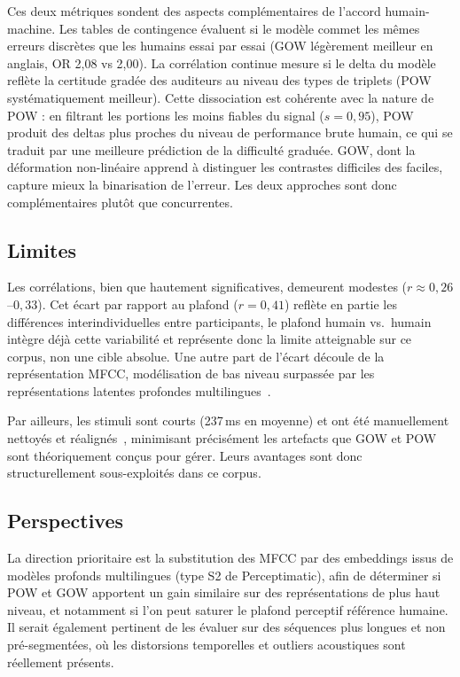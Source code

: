 \documentclass{article}
\begin{document}
Ces deux métriques sondent des aspects complémentaires de l'accord
humain-machine. Les tables de contingence évaluent si le modèle commet
les mêmes erreurs discrètes que les humains essai par essai (GOW légèrement
meilleur en anglais, OR 2,08 vs 2,00). La corrélation continue mesure si
le delta du modèle reflète la certitude gradée des auditeurs au niveau des
types de triplets (POW systématiquement meilleur). Cette dissociation est
cohérente avec la nature de POW : en filtrant les portions les moins fiables
du signal ($s = 0{,}95$), POW produit des deltas plus proches du niveau de
performance brute humain, ce qui se traduit par une meilleure prédiction de
la difficulté graduée. GOW, dont la déformation non-linéaire apprend à
distinguer les contrastes difficiles des faciles, capture mieux la
binarisation de l'erreur. Les deux approches sont donc complémentaires
plutôt que concurrentes.

\subsection{Limites}

Les corrélations, bien que hautement significatives, demeurent modestes
($r \approx 0{,}26$--$0{,}33$). Cet écart par rapport au plafond
($r = 0{,}41$) reflète en partie les différences interindividuelles entre
participants, le plafond humain vs.\ humain intègre déjà cette variabilité
et représente donc la limite atteignable sur ce corpus, non une cible
absolue. Une autre part de l'écart découle de la représentation MFCC,
modélisation de bas niveau surpassée par les représentations latentes
profondes multilingues~\cite{perceptimatic2020}.

Par ailleurs, les stimuli sont courts (237\,ms en moyenne) et ont été
manuellement nettoyés et réalignés~\cite{perceptimatic2020}, minimisant
précisément les artefacts que GOW et POW sont théoriquement conçus pour
gérer. Leurs avantages sont donc structurellement sous-exploités dans ce
corpus.

\subsection{Perspectives}

La direction prioritaire est la substitution des MFCC par des embeddings
issus de modèles profonds multilingues (type S2 de Perceptimatic), afin de
déterminer si POW et GOW apportent un gain similaire sur des représentations
de plus haut niveau, et notamment si l'on peut saturer le plafond perceptif
référence humaine. Il serait également pertinent de les évaluer sur des
séquences plus longues et non pré-segmentées, où les distorsions temporelles
et outliers acoustiques sont réellement présents.
\end{document}
